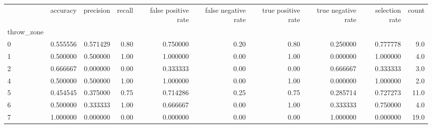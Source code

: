 \begin{tabular}{lrrrrrrrrr}
\toprule
{} &  accuracy &  precision &  recall &  false positive rate &  false negative rate &  true positive rate &  true negative rate &  selection rate &  count \\
throw\_zone &           &            &         &                      &                      &                     &                     &                 &        \\
\midrule
0          &  0.555556 &   0.571429 &    0.80 &             0.750000 &                 0.20 &                0.80 &            0.250000 &        0.777778 &    9.0 \\
1          &  0.500000 &   0.500000 &    1.00 &             1.000000 &                 0.00 &                1.00 &            0.000000 &        1.000000 &    4.0 \\
2          &  0.666667 &   0.000000 &    0.00 &             0.333333 &                 0.00 &                0.00 &            0.666667 &        0.333333 &    3.0 \\
4          &  0.500000 &   0.500000 &    1.00 &             1.000000 &                 0.00 &                1.00 &            0.000000 &        1.000000 &    2.0 \\
5          &  0.454545 &   0.375000 &    0.75 &             0.714286 &                 0.25 &                0.75 &            0.285714 &        0.727273 &   11.0 \\
6          &  0.500000 &   0.333333 &    1.00 &             0.666667 &                 0.00 &                1.00 &            0.333333 &        0.750000 &    4.0 \\
7          &  1.000000 &   0.000000 &    0.00 &             0.000000 &                 0.00 &                0.00 &            1.000000 &        0.000000 &   19.0 \\
\bottomrule
\end{tabular}
